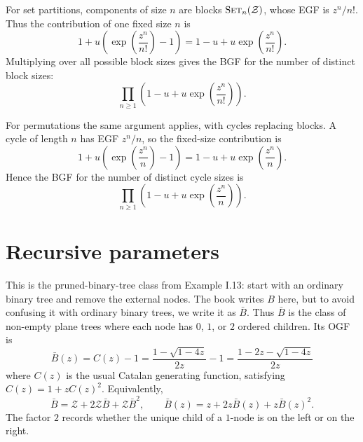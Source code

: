 For set partitions, components of size $n$ are blocks $\mathrm{S}\textsc{et}_{n}(\mathcal{Z})$,
whose EGF is $z^n/n!$. Thus the contribution of one fixed size $n$ is
\begin{equation*}
    1 + u\left(\exp\left(\frac{z^n}{n!}\right) - 1\right)
        = 1 - u + u\exp\left(\frac{z^n}{n!}\right).
\end{equation*}
Multiplying over all possible block sizes gives the BGF for the number of distinct block sizes:
\begin{equation*}
    \prod_{n \geq 1}\left(1 - u + u\exp\left(\frac{z^n}{n!}\right)\right).
\end{equation*}

For permutations the same argument applies, with cycles replacing blocks. A cycle of length
$n$ has EGF $z^n/n$, so the fixed-size contribution is
\begin{equation*}
    1 + u\left(\exp\left(\frac{z^n}{n}\right) - 1\right)
        = 1 - u + u\exp\left(\frac{z^n}{n}\right).
\end{equation*}
Hence the BGF for the number of distinct cycle sizes is
\begin{equation*}
    \prod_{n \geq 1}\left(1 - u + u\exp\left(\frac{z^n}{n}\right)\right).
\end{equation*}

\section{Recursive parameters}

This is the pruned-binary-tree class from Example I.13: start with an ordinary binary tree and
remove the external nodes. The book writes $B$ here, but to avoid confusing it with ordinary
binary trees, we write it as $\bar{B}$. Thus $\bar{B}$ is the class of non-empty plane trees
where each node has $0$, $1$, or $2$ ordered children. Its OGF is
\begin{equation*}
    \bar{B}(z) = C(z) - 1 = \frac{1 - \sqrt{1 - 4z}}{2z} - 1 = \frac{1 - 2z - \sqrt{1 - 4z}}{2z}
\end{equation*}
where $C(z)$ is the usual Catalan generating function, satisfying $C(z) = 1 + zC(z)^{2}$.
Equivalently,
\begin{equation*}
    \bar{B} = \mathcal{Z} + 2\mathcal{Z}\bar{B} + \mathcal{Z}\bar{B}^{2},
    \qquad
    \bar{B}(z) = z + 2z\bar{B}(z) + z\bar{B}(z)^2.
\end{equation*}
The factor $2$ records whether the unique child of a $1$-node is on the left or on the right.

